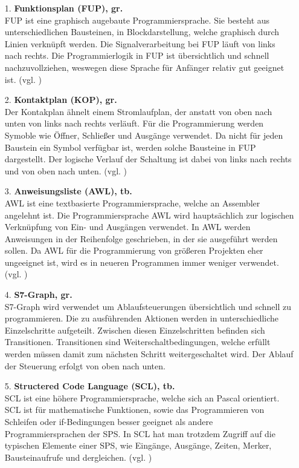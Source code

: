     \begin{itemize}
        \item [1.] \textbf{Funktionsplan (FUP), gr.} \\
            FUP ist eine graphisch augebaute Programmiersprache. Sie besteht aus unterschiedlichen Bausteinen, in Blockdarstellung, welche graphisch durch Linien verknüpft werden. Die Signalverarbeitung bei FUP läuft von links nach rechts. Die Programmierlogik in FUP ist übersichtlich und schnell nachzuvollziehen, weswegen diese Sprache für Anfänger relativ gut geeignet ist. 
            (vgl. \cite{Programmiersprachen_der_SPS})

        \item[2.] \textbf{Kontaktplan (KOP), gr.} \\
            Der Kontakplan ähnelt einem Stromlaufplan, der anstatt von oben nach unten von links nach rechts verläuft. Für die Programmierung werden Symoble wie Öffner, Schließer und Ausgänge verwendet. Da nicht für jeden Baustein ein Symbol verfügbar ist, werden solche Bausteine in FUP dargestellt. Der logische Verlauf der Schaltung ist dabei von links nach rechts und von oben nach unten.
            (vgl. \cite{Programmiersprachen_der_SPS})

        \item[3.] \textbf{Anweisungsliste (AWL), tb.}\\
            AWL ist eine textbasierte Programmiersprache, welche an Assembler angelehnt ist. Die Programmiersprache AWL wird hauptsächlich zur logischen Verknüpfung von Ein- und Ausgängen verwendet. In AWL werden Anweisungen in der Reihenfolge geschrieben, in der sie ausgeführt werden sollen. Da AWL für die Programmierung von größeren Projekten eher ungeeignet ist, wird es in neueren Programmen immer weniger verwendet.
            (vgl. \cite{Anweisungsliste})

        \item[4.] \textbf{S7-Graph, gr.} \\
            S7-Graph wird verwendet um Ablaufsteuerungen übersichtlich und schnell zu programmieren. Die zu ausführenden Aktionen werden in unterschiedliche Einzelschritte aufgeteilt. Zwischen diesen Einzelschritten befinden sich Transitionen. Transitionen sind Weiterschaltbedingungen, welche erfüllt werden müssen damit zum nächsten Schritt weitergeschaltet wird. Der Ablauf der Steuerung erfolgt von oben nach unten. 

        \item[5.] \textbf{Structered Code Language (SCL), tb.} \\
            SCL ist eine höhere Programmiersprache, welche sich an Pascal orientiert. SCL ist für mathematische Funktionen, sowie das Programmieren von Schleifen oder if-Bedingungen besser geeignet als andere Programmiersprachen der SPS. In SCL hat man trotzdem Zugriff auf die typischen Elemente einer SPS, wie Eingänge, Ausgänge, Zeiten, Merker, Bausteinaufrufe und dergleichen.
            (vgl. \cite{SCL})

    \end{itemize}


